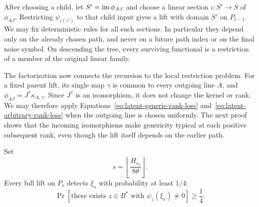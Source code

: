 After choosing a child, let $S'=\operatorname{im}\phi_{AJ}$ and choose a linear section
$\iota:S'\to S$ of $\phi_{AJ}$.  Restricting $\psi_{\iota(z')}$ to that
child input gives a lift with domain $S'$ on $P_{t-1}$.
We may fix deterministic rules for all such sections.  In particular they
depend only on the already chosen path, and never on a future path index
or on the final noise symbol.  On descending the tree, every surviving
functional is a restriction of a member of the original linear family.

The factorization now connects the recursion to the local restriction
problem.  For a fixed parent lift, its single map $\gamma$ is common to
every outgoing line $A$, and
$\phi_{AJ}=J^*\kappa_{A,\gamma}$.  Since $J^*$ is an isomorphism, it does
not change the kernel or rank.  We may therefore apply
Equations~\eqref{eq:latent-generic-rank-loss}
and~\eqref{eq:latent-arbitrary-rank-loss} when the outgoing line is chosen
uniformly.  The next proof shows that the incoming isomorphisms make
genericity typical at each positive subsequent rank, even though the lift
itself depends on the earlier path.

\begin{proposition}\label{prop:latent-full-lift-detection}
Set
\begin{equation}\label{eq:latent-depth}
 s=\left\lfloor\frac{H_{r_0}}{8\theta}\right\rfloor.
\end{equation}
Every full lift on $P_s$ detects $\xi_s$ with probability at least $1/4$:
\begin{equation}\label{eq:latent-full-lift-detection}
 \Pr[\text{there exists }z\in B^*\text{ with }\psi_z(\xi_s)\ne0]
 \ge\frac14.
\end{equation}
\end{proposition}

